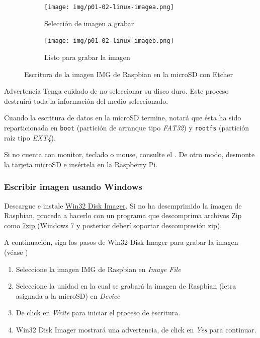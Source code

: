 \documentclass[letterpaper,10.5pt]{article}
\begin{document}
\begin{figure}[H]
	\centering%
	\begin{subfigure}[b]{0.5\linewidth}
		\centering
		\texttt{[image: img/p01-02-linux-imagea.png]} %
		\caption{Selección de imagen a grabar}
		\label{fig:write-image-linux-a} %
	\end{subfigure}%
	\begin{subfigure}[b]{0.5\linewidth}
		\centering
		\texttt{[image: img/p01-02-linux-imageb.png]} %
		\caption{Listo para grabar la imagen}
		\label{fig:write-image-linux-b} %
	\end{subfigure}
	\caption{Escritura de la imagen IMG de Raspbian en la microSD con Etcher}%
	\label{fig:write-image-linux} %
\end{figure}

\begin{importantbox}{Advertencia}
Tenga cuidado de no seleccionar su disco duro.
Este proceso destruirá toda la información del medio seleccionado.
\end{importantbox}

Cuando la escritura de datos en la microSD termine, notará que ésta ha sido reparticionada en \texttt{boot} (partición de arranque tipo \textit{FAT32}) y \texttt{rootfs} (partición raíz tipo \textit{EXT4}).

Si no cuenta con monitor, teclado o mouse, consulte el .
De otro modo, desmonte la tarjeta microSD e insértela en la Raspberry Pi.

%
%
\subsubsection{Escribir imagen usando Windows}%
Descargue e instale \href{https://sourceforge.net/projects/win32diskimager/}{Win32 Disk Imager}.
Si no ha descmprimido la imagen de Raspbian, proceda a hacerlo con un programa que descomprima archivos Zip como \href{https://www.7-zip.org/download.html}{7zip} (Windows 7 y posterior deberí soportar descompresión zip).

A continuación, siga los pasos de Win32 Disk Imager para grabar la imagen (véase )
\begin{enumerate}[noitemsep]
	\item Seleccione la imagen IMG de Raspbian en \emph{Image File}
	\item Seleccione la unidad en la cual se grabará la imagen de Raspbian (letra asignada a la microSD) en \emph{Device}
	\item De click en \emph{Write} para iniciar el proceso de escritura.
	\item Win32 Disk Imager mostrará una advertencia, de click en \emph{Yes} para continuar.
\end{enumerate}
\end{document}
